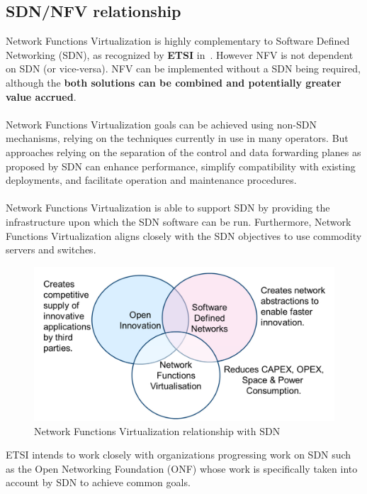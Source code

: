 \documentclass[a4paper, 12pt]{book}
\begin{document}
\subsection{SDN/NFV relationship}

Network Functions Virtualization is highly complementary to Software Defined Networking (SDN), as recognized by \textbf{ETSI} in~\cite{ETSINFVDefinition}. However NFV is not dependent on SDN (or vice-versa). NFV can be implemented without a SDN being required, although the \textbf{both solutions can be combined and potentially greater value accrued}.\\
\\
Network Functions Virtualization goals can be achieved using non-SDN mechanisms, relying on the techniques currently in use in many operators. But approaches relying on the separation of the control and data forwarding planes as proposed by SDN can enhance performance, simplify compatibility with existing deployments, and facilitate operation and maintenance procedures.\\
\\
Network Functions Virtualization is able to support SDN by providing the infrastructure upon which the SDN software can be run. Furthermore, Network Functions Virtualization aligns closely with the SDN objectives to use commodity servers and switches.

\begin{center}
 \begin{figure}[H]
 \begin{center}
   \includegraphics[width=15cm]{img/sdn-nfv-relationship-00.png}
   \caption{Network Functions Virtualization relationship with SDN}
   \label{fig:nfv_sdn_relationship}
 \end{center}
 \end{figure}
\end{center}
ETSI intends to work closely with organizations progressing work on SDN such as the Open Networking Foundation (ONF) whose work is specifically taken into account by SDN to achieve common goals.
\end{document}
